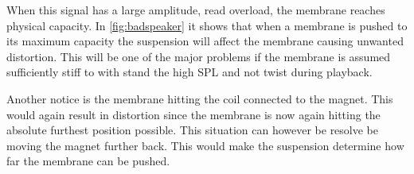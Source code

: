When this signal has a large amplitude, read overload, the membrane reaches physical capacity. In \autoref{fig:badspeaker} it shows that when a membrane is pushed to its maximum capacity the suspension will affect the membrane causing unwanted distortion. This will be one of the major problems if the membrane is assumed sufficiently stiff to with stand the high \gls{SPL} and not twist during playback. 

Another notice is the membrane hitting the coil connected to the magnet. This would again result in distortion since the membrane is now again hitting the absolute furthest position possible. This situation can however be resolve be moving the magnet further back. This would make the suspension determine how far the membrane can be pushed.


